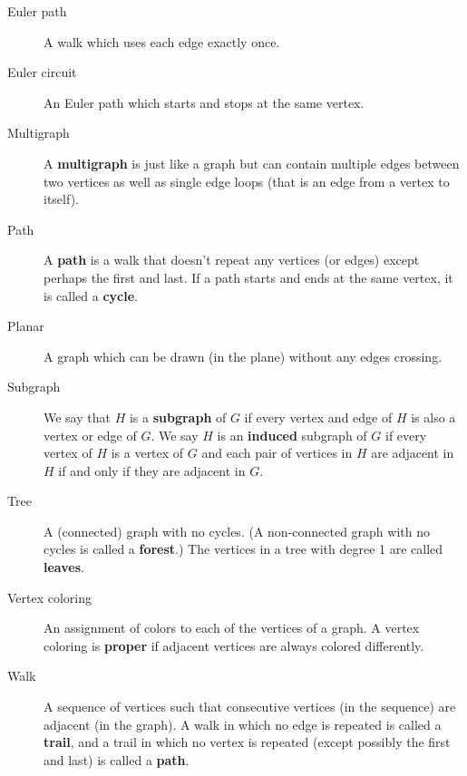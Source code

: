 \documentclass[11pt,]{book}
\newcommand{\terminology}[1]{\textbf{#1}}
\theoremstyle{ptxplainnotitle}
\theoremstyle{ptxplaintitle}
\theoremstyle{ptxdefinitionnotitle}
\theoremstyle{ptxdefinitiontitle}
\theoremstyle{ptxdefinitionnotitle}
\theoremstyle{ptxdefinitiontitle}
\theoremstyle{ptxdefinitionnotitle}
\theoremstyle{ptxdefinitiontitle}
\theoremstyle{ptxdefinitiontitlenonumber}
\theoremstyle{ptxdefinitiontitlenonumber}
\numberwithin{equation}{chapter}
\begin{document}
\begin{description}
\item[{Euler path}]\hypertarget{li-1348}{}\hypertarget{p-2773}{}%
A walk which uses each edge exactly once.%
\item[{Euler circuit}]\hypertarget{li-1349}{}\hypertarget{p-2774}{}%
 An Euler path which starts and stops at the same vertex.%
\item[{Multigraph}]\hypertarget{li-1350}{}\hypertarget{p-2775}{}%
 A \terminology{multigraph} is just like a graph but can contain multiple edges between two vertices as well as single edge loops (that is an edge from a vertex to itself).%
\item[{Path}]\hypertarget{li-1351}{}\hypertarget{p-2776}{}%
A \terminology{path} is a walk that doesn't repeat any vertices (or edges) except perhaps the first and last.  If a path starts and ends at the same vertex, it is called a \terminology{cycle}.%
\item[{Planar}]\hypertarget{li-1352}{}\hypertarget{p-2777}{}%
 A graph which can be drawn (in the plane) without any edges crossing.%
\item[{Subgraph}]\hypertarget{li-1353}{}\hypertarget{p-2778}{}%
 We say that \(H\) is a \terminology{subgraph} of \(G\) if every vertex and edge of \(H\) is also a vertex or edge of \(G\). We say \(H\) is an \terminology{induced} subgraph of \(G\) if every vertex of \(H\) is a vertex of \(G\) and each pair of vertices in \(H\) are adjacent in \(H\) if and only if they are adjacent in \(G\).%
\item[{Tree}]\hypertarget{li-1354}{}\hypertarget{p-2779}{}%
 A (connected) graph with no cycles. (A non-connected graph with no cycles is called a \terminology{forest}.) The vertices in a tree with degree 1 are called \terminology{leaves}.%
\item[{Vertex coloring}]\hypertarget{li-1355}{}\hypertarget{p-2780}{}%
 An assignment of colors to each of the vertices of a graph. A vertex coloring is \terminology{proper} if adjacent vertices are always colored differently.%
\item[{Walk}]\hypertarget{li-1356}{}\hypertarget{p-2781}{}%
 A sequence of vertices such that consecutive vertices (in the sequence) are adjacent (in the graph). A walk in which no edge is repeated is called a \terminology{trail}, and a trail in which no vertex is repeated (except possibly the first and last) is called a \terminology{path}.%
\end{description}
%
\typeout{************************************************}
\typeout{************************************************}
\end{document}
